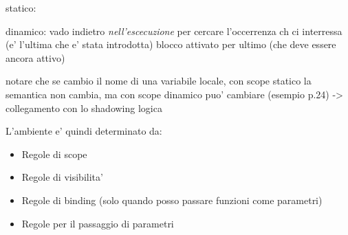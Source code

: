 statico:


dinamico: 
vado indietro \textit{nell'escecuzione} per cercare l'occerrenza ch ci interressa (e' l'ultima che e' stata introdotta) blocco attivato per ultimo (che deve essere ancora attivo)

notare che se cambio il nome di una variabile locale, con scope statico la semantica non cambia, ma con scope dinamico puo' cambiare (esempio p.24) -> collegamento con lo shadowing logica

L'ambiente e' quindi determinato da:
\begin{itemize}
\item Regole di scope
\item Regole di visibilita'
\item Regole di binding (solo quando posso passare funzioni come parametri)
\item Regole per il passaggio di parametri
\end{itemize}

% 
